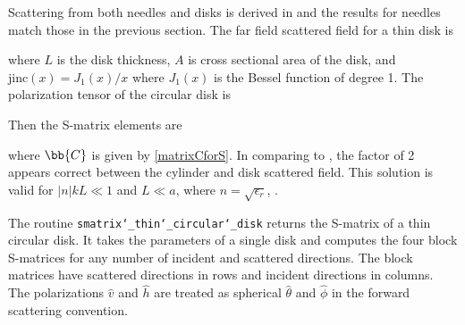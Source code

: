 Scattering from both needles and disks is derived in \cite{schiffer1979light} and the results for needles match those in the previous section. The far field scattered field for a thin disk is

\noindent where $L$ is the disk thickness, $A$ is cross sectional area of the disk, and $\textrm{jinc}(x) = J_1(x)/x$ where $J_1(x)$ is the Bessel function of degree 1. The polarization tensor of the circular disk is 
  
  
Then the S-matrix elements are 

\noindent where $\bb{C}$ is given by \eqref{matrixCforS}. In comparing \cite{schiffer1979light} to \cite{sarabandi1990low, stiles1996scattering}, the factor of 2 appears correct between the cylinder and disk scattered field. This solution is valid for $\vert n \vert kL \ll 1$ and $L \ll a$, where $n = \sqrt{\epsilon_r}$, \cite{schiffer1979light}.

The routine \texttt{smatrix\char`_thin\char`_circular\char`_disk} returns the S-matrix of a thin circular disk. It takes the parameters of a single disk and computes the four block S-matrices for any number of incident and scattered directions. The block matrices have scattered directions in rows and incident directions in columns. The polarizations $\hat{v}$ and $\hat{h}$ are treated as spherical $\hat{\theta}$ and $\hat{\phi}$ in the forward scattering convention.

